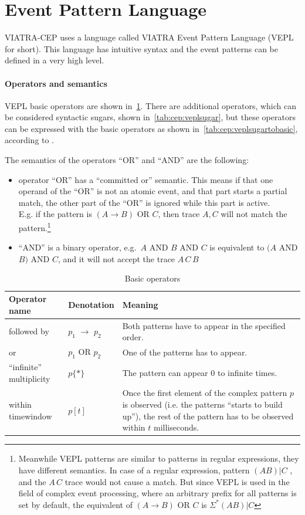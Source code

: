 \section{Event Pattern Language}
VIATRA-CEP uses a language called VIATRA Event Pattern Language (VEPL for short).
This language has intuitive syntax and the event patterns can be defined in
a very high level. 

\paragraph{Operators and semantics}
VEPL basic operators are shown in~\cref{tab:cep:veplop}.
There are additional operators, which can be considered syntactic sugars, shown in~\cref{tab:cep:veplsugar},
but these operators can be expressed with the basic operators as shown in~\cref{tab:cep:veplsugartobasic}, according to \citep{CEP}.

The semantics of the operators ``OR'' and ``AND'' are the following:
\begin{itemize}
	\item operator ``OR'' has a ``committed or'' semantic. This means if that one operand of the ``OR'' is not an atomic event, and that part starts a partial match, the other part of the ``OR'' is ignored while this part is active. \\
	E.g. if the pattern is $(A \rightarrow B)$ OR $C$,
	then trace $A,C$ will not match the pattern.\footnote{Meanwhile VEPL patterns are similar to patterns in regular expressions, they have different semantics. In case of a regular expression, pattern $(AB)|C$ , and the $A\,C$ trace would not cause a match. But since VEPL is used in the field of complex event processing, where an arbitrary prefix for all patterns is set by default, the equivalent of $(A \rightarrow B)$ OR $C$ is $\Sigma^\ast (AB)|C$}
	\item ``AND'' is a binary operator, e.g.~$A$ AND $B$ AND $C$ is equivalent to $(A$ AND $B)$ AND $C$,
	and it will not accept the trace $A\,C\,B$
\end{itemize}

\begin{table}
	\caption{Basic operators}		
	\label{tab:cep:veplop}
	\begin{tabularx}{\textwidth}{llX}
		\toprule
		Operator name &	Denotation & Meaning \\
		\midrule
		followed by & $p_1$ $\rightarrow$ $p_2$ & Both patterns have to appear in the specified order. \\
		or & $p_1$ OR $p_2$ &	One of the patterns has to appear. \\
		``infinite'' multiplicity & $p\{{\ast}\}$ & The pattern can appear 0 to infinite times. \\
		within timewindow &	$p[t]$ & Once the first element of the complex pattern $p$ is observed (i.e. the patterns ``starts to build up''), the rest of the pattern has to be observed within $t$ milliseconds. \\
		\bottomrule
	\end{tabularx}
\end{table}

